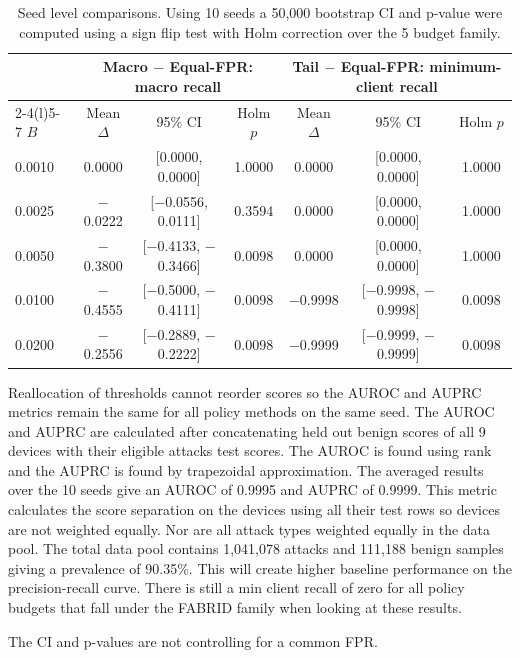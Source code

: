 \documentclass[pdflatex,sn-mathphys-num]{sn-jnl}
\begin{document}
\begin{table}[tbp]
\caption{Seed level comparisons. Using 10 seeds a 50,000 bootstrap CI and p-value were computed using a sign flip test with Holm correction over the 5 budget family.}
\label{tab:contrasts}
\centering
\small
\renewcommand{\arraystretch}{1.00}
\setlength{\tabcolsep}{4pt}
\begin{tabular*}{\textwidth}{@{\extracolsep{\fill}}lcccccc@{}}
\toprule
& \multicolumn{3}{c}{Macro $-$ Equal-FPR: macro recall} & \multicolumn{3}{c}{Tail $-$ Equal-FPR: minimum-client recall}\\
\cmidrule(lr){2-4}\cmidrule(l){5-7}
$B$ & Mean $\Delta$ & 95\% CI & Holm $p$ & Mean $\Delta$ & 95\% CI & Holm $p$\\
\midrule
0.0010 & 0.0000 & [0.0000, 0.0000] & 1.0000 & 0.0000 & [0.0000, 0.0000] & 1.0000\\
0.0025 & $-$0.0222 & [$-$0.0556, 0.0111] & 0.3594 & 0.0000 & [0.0000, 0.0000] & 1.0000\\
0.0050 & $-$0.3800 & [$-$0.4133, $-$0.3466] & 0.0098 & 0.0000 & [0.0000, 0.0000] & 1.0000\\
0.0100 & $-$0.4555 & [$-$0.5000, $-$0.4111] & 0.0098 & $-$0.9998 & [$-$0.9998, $-$0.9998] & 0.0098\\
0.0200 & $-$0.2556 & [$-$0.2889, $-$0.2222] & 0.0098 & $-$0.9999 & [$-$0.9999, $-$0.9999] & 0.0098\\
\bottomrule
\end{tabular*}
\end{table}

Reallocation of thresholds cannot reorder scores so the AUROC and AUPRC metrics remain the same for all policy methods on the same seed. The AUROC and AUPRC are calculated after concatenating held out benign scores of all 9 devices with their eligible attacks test scores. The AUROC is found using rank and the AUPRC is found by trapezoidal approximation. The averaged results over the 10 seeds give an AUROC of 0.9995 and AUPRC of 0.9999. This metric calculates the score separation on the devices using all their test rows so devices are not weighted equally. Nor are all attack types weighted equally in the data pool. The total data pool contains 1,041,078 attacks and 111,188 benign samples giving a prevalence of 90.35\%. This will create higher baseline performance on the precision-recall curve. There is still a min client recall of zero for all policy budgets that fall under the FABRID family when looking at these results.

The CI and p-values are not controlling for a common FPR.
\end{document}

